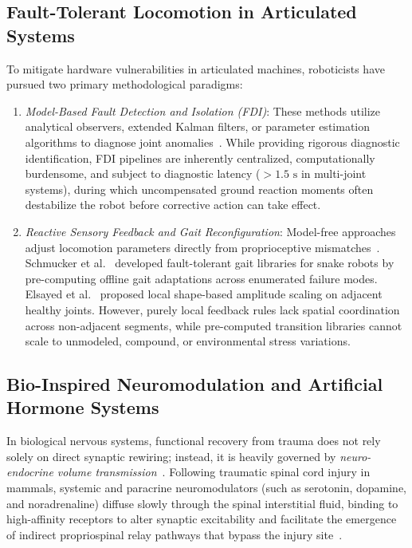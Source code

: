 \documentclass{iopjournal}
\begin{document}
\subsection{Fault-Tolerant Locomotion in Articulated Systems}
To mitigate hardware vulnerabilities in articulated machines, roboticists have pursued two primary methodological paradigms:
\begin{enumerate}
  \item \textit{Model-Based Fault Detection and Isolation (FDI)}: These methods utilize analytical observers, extended Kalman filters, or parameter estimation algorithms to diagnose joint anomalies~\cite{elsayed2021,tanaka2015}. While providing rigorous diagnostic identification, FDI pipelines are inherently centralized, computationally burdensome, and subject to diagnostic latency ($>1.5\text{ s}$ in multi-joint systems), during which uncompensated ground reaction moments often destabilize the robot before corrective action can take effect.
  \item \textit{Reactive Sensory Feedback and Gait Reconfiguration}: Model-free approaches adjust locomotion parameters directly from proprioceptive mismatches~\cite{sartoretti2019,righetti2008}. Schmucker et al.~\cite{schmucker2022} developed fault-tolerant gait libraries for snake robots by pre-computing offline gait adaptations across enumerated failure modes. Elsayed et al.~\cite{elsayed2021} proposed local shape-based amplitude scaling on adjacent healthy joints. However, purely local feedback rules lack spatial coordination across non-adjacent segments, while pre-computed transition libraries cannot scale to unmodeled, compound, or environmental stress variations.
\end{enumerate}

\subsection{Bio-Inspired Neuromodulation and Artificial Hormone Systems}
In biological nervous systems, functional recovery from trauma does not rely solely on direct synaptic rewiring; instead, it is heavily governed by \textit{neuro-endocrine volume transmission}~\cite{bargmann2012,sillar2014}. Following traumatic spinal cord injury in mammals, systemic and paracrine neuromodulators (such as serotonin, dopamine, and noradrenaline) diffuse slowly through the spinal interstitial fluid, binding to high-affinity receptors to alter synaptic excitability and facilitate the emergence of indirect propriospinal relay pathways that bypass the injury site~\cite{courtine2008,rossignol2011,courtine2009}.
\end{document}
